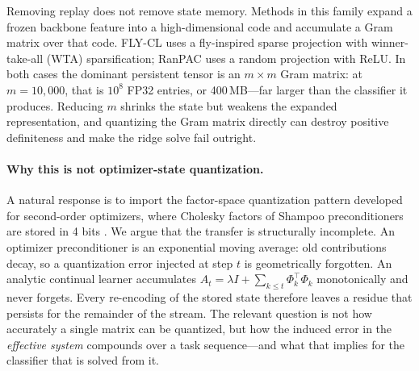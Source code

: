 \documentclass{article}
\begin{document}
Removing replay does not remove state memory. Methods in this family expand a
frozen backbone feature into a high-dimensional code and accumulate a Gram
matrix over that code. FLY-CL \citep{zou2026flycl} uses a fly-inspired sparse
projection with winner-take-all (WTA) sparsification; RanPAC
\citep{mcdonnell2023ranpac} uses a random projection with ReLU. In both cases
the dominant persistent tensor is an $m\times m$ Gram matrix: at $m=10{,}000$,
that is $10^8$ FP32 entries, or 400\,MB---far larger than the classifier it
produces. Reducing $m$ shrinks the state but weakens the expanded
representation, and quantizing the Gram matrix directly can destroy positive
definiteness and make the ridge solve fail outright.

\paragraph{Why this is not optimizer-state quantization.}
A natural response is to import the factor-space quantization pattern
developed for second-order optimizers, where Cholesky factors of Shampoo
preconditioners are stored in 4 bits \citep{li2025fourbit,wang2024fourbitshampoo}.
We argue that the transfer is structurally incomplete. An optimizer
preconditioner is an exponential moving average: old contributions decay, so a
quantization error injected at step $t$ is geometrically forgotten. An analytic
continual learner accumulates
$A_t=\lambda I+\sum_{k\le t}\Phi_k^{\top}\Phi_k$ monotonically and never
forgets. Every re-encoding of the stored state therefore leaves a residue that
persists for the remainder of the stream. The relevant question is not how
accurately a single matrix can be quantized, but how the induced error in the
\emph{effective system} compounds over a task sequence---and what that implies
for the classifier that is solved from it.
\end{document}
